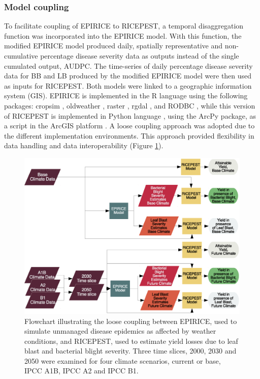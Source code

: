 \documentclass[preprint,12pt]{elsarticle}
\begin{document}
\subsubsection{Model coupling}
To facilitate coupling of EPIRICE to RICEPEST, a temporal disaggregation function was incorporated into the EPIRICE model. With this function, the modified EPIRICE model produced daily, spatially representative and non-cumulative percentage disease severity data as outputs instead of the single cumulated output, AUDPC. The time-series of daily percentage disease severity data for BB and LB produced by the modified EPIRICE model were then used as inputs for RICEPEST. Both models were linked to a geographic information system (GIS). EPIRICE is implemented in the R language using the following packages: cropsim \cite{Hijmans2009}, oldweather \cite{Hijmans2009}, raster \cite{Hijmans2014}, rgdal \cite{Bivand2014}, and RODBC \cite{Ripley2013}, while this version of RICEPEST is implemented in Python language \cite{python}, using the ArcPy package, as a script in the ArcGIS platform \cite{ESRI2011}. A loose coupling approach was adopted due to the different implementation environments. This approach provided flexibility in data handling and data interoperability (Figure \ref{Flowchart}).

 \begin{figure}[H]
  \includegraphics[width = 140mm]{figures/Simulation_Tree_Flowchart}
  \caption{Flowchart illustrating the loose coupling between EPIRICE, used to simulate unmanaged disease epidemics as affected by weather conditions, and RICEPEST, used to estimate yield losses due to leaf blast and bacterial blight severity. Three time slices, 2000, 2030 and 2050 were examined for four climate scenarios, current or base, IPCC A1B, IPCC A2 and IPCC B1.}
  \label{Flowchart}
\end{figure} 
\end{document}
